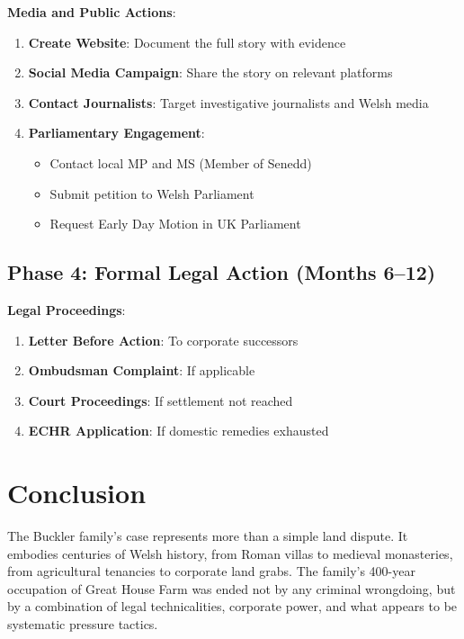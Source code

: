 \documentclass[11pt,a4paper]{article}
\begin{document}
\begin{action}
\textbf{Media and Public Actions}:
\begin{enumerate}[label=\arabic*.]
    \item \textbf{Create Website}: Document the full story with evidence
    \item \textbf{Social Media Campaign}: Share the story on relevant platforms
    \item \textbf{Contact Journalists}: Target investigative journalists and Welsh media
    \item \textbf{Parliamentary Engagement}:
    \begin{itemize}
        \item Contact local MP and MS (Member of Senedd)
        \item Submit petition to Welsh Parliament
        \item Request Early Day Motion in UK Parliament
    \end{itemize}
\end{enumerate}
\end{action}

\subsection{Phase 4: Formal Legal Action (Months 6--12)}

\begin{action}
\textbf{Legal Proceedings}:
\begin{enumerate}[label=\arabic*.]
    \item \textbf{Letter Before Action}: To corporate successors
    \item \textbf{Ombudsman Complaint}: If applicable
    \item \textbf{Court Proceedings}: If settlement not reached
    \item \textbf{ECHR Application}: If domestic remedies exhausted
\end{enumerate}
\end{action}

\newpage

\section{Conclusion}

The Buckler family's case represents more than a simple land dispute. It embodies centuries of Welsh history, from Roman villas to medieval monasteries, from agricultural tenancies to corporate land grabs. The family's 400-year occupation of Great House Farm was ended not by any criminal wrongdoing, but by a combination of legal technicalities, corporate power, and what appears to be systematic pressure tactics.
\end{document}
